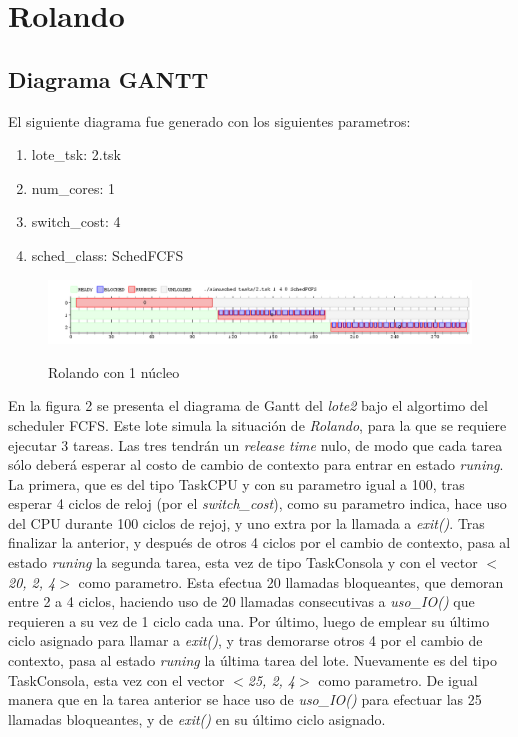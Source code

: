 \section{Rolando}

\subsection{Diagrama GANTT}

El siguiente diagrama fue generado con los siguientes parametros:

\begin{enumerate}
	\item lote\_tsk: 2.tsk
	\item num\_cores: 1
	\item switch\_cost: 4
	\item sched\_class: SchedFCFS
\end{enumerate}

\begin{figure}[h]
    \includegraphics[width=\linewidth]{images/2_1nucleo.png}
    \label{fig:Task Consola}
    \caption{Rolando con 1 núcleo}
\end{figure}

En la figura 2 se presenta el diagrama de Gantt del \textit{lote2} bajo el algortimo del scheduler FCFS. Este lote simula la situaci\'on de \textit{Rolando}, para la que se requiere ejecutar 3 tareas. Las tres tendr\'an un \textit{release time} nulo, de modo que cada tarea s\'olo deber\'a esperar al costo de cambio de contexto para entrar en estado \textit{runing}. La primera, que es del tipo TaskCPU y con su parametro igual a 100, tras esperar 4 ciclos de reloj (por el \textit{switch\_cost}), como su parametro indica, hace uso del CPU durante 100 ciclos de rejoj, y uno extra por la llamada a \textit{exit()}. Tras finalizar la anterior, y despu\'es de otros 4 ciclos por el cambio de contexto, pasa al estado \textit{runing} la segunda tarea, esta vez de tipo TaskConsola y con el vector \textit{$<$20, 2, 4$>$} como parametro. Esta efectua 20 llamadas bloqueantes, que demoran entre 2 a 4 ciclos, haciendo uso de 20 llamadas consecutivas a \textit{uso\_IO()} que requieren a su vez de 1 ciclo cada una. Por \'ultimo, luego de emplear su \'ultimo ciclo asignado para llamar a \textit{exit()}, y tras demorarse otros 4 por el cambio de contexto, pasa al estado \textit{runing} la \'ultima tarea del lote. Nuevamente es del tipo TaskConsola, esta vez con el vector \textit{$<$25, 2, 4$>$} como parametro. De igual manera que en la tarea anterior se hace uso de \textit{uso\_IO()} para efectuar las 25 llamadas bloqueantes, y de \textit{exit()} en su \'ultimo ciclo asignado.

